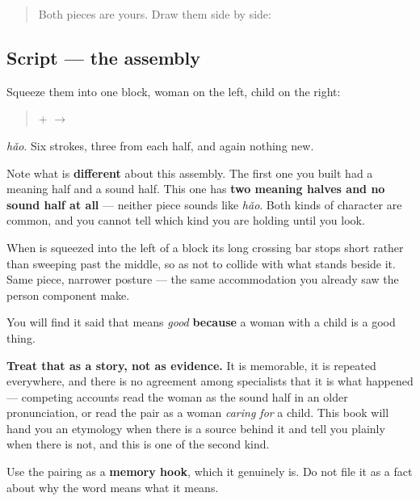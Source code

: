 \begin{quote}
Both pieces are yours. Draw them side by side:

\begin{quote}
   
\end{quote}
\end{quote}

\subsection*{Script — the assembly}

Squeeze them into one block, woman on the left, child on the right:

\begin{quote}
\textbf{} + \textbf{} $\to$ \textbf{}
\end{quote}

\textbf{} \emph{hǎo}. Six strokes, three from each half, and again nothing new.

Note what is \textbf{different} about this assembly. The first one you built had a meaning half and a sound half. This one has \textbf{two meaning halves and no sound half at all} — neither piece sounds like \emph{hǎo}. Both kinds of character are common, and you cannot tell which kind you are holding until you look.

When  is squeezed into the left of a block its long crossing bar stops short rather than sweeping past the middle, so as not to collide with what stands beside it. Same piece, narrower posture — the same accommodation you already saw the person component make.

\begin{grammarlens}[title={What you've built — and a caution}]
You will find it said that  means \emph{good} \textbf{because} a woman with a child is a good thing.

\textbf{Treat that as a story, not as evidence.} It is memorable, it is repeated everywhere, and there is no agreement among specialists that it is what happened — competing accounts read the woman as the sound half in an older pronunciation, or read the pair as a woman \emph{caring for} a child. This book will hand you an etymology when there is a source behind it and tell you plainly when there is not, and this is one of the second kind.

Use the pairing as a \textbf{memory hook}, which it genuinely is. Do not file it as a fact about why the word means what it means.
\end{grammarlens}

